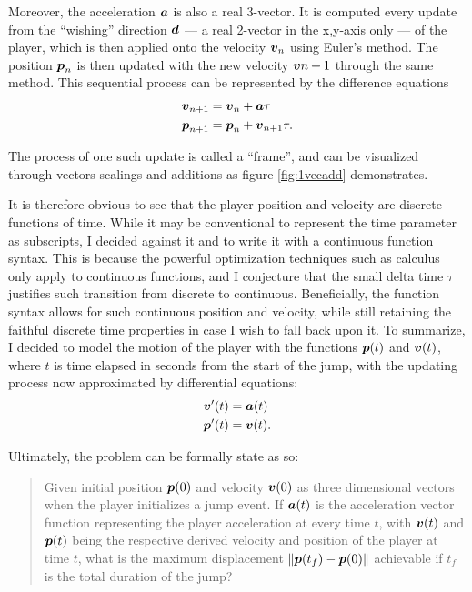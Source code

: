 Moreover, the acceleration $\boldsymbol{a}$ is also a real 3-vector. It is computed every update from the ``wishing'' direction $\boldsymbol{d}$ --- a real 2-vector in the x,y-axis only --- of the player, which is then applied onto the velocity $\boldsymbol{v}_n$ using Euler's method. The position $\boldsymbol{p}_n$ is then updated with the new velocity $\boldsymbol{v}{n+1}$ through the same method. This sequential process can be represented by the difference equations
\begin{align}
    \boldsymbol{v}_{n+1} &= \boldsymbol{v}_n + \boldsymbol{a} \tau\\
    \boldsymbol{p}_{n+1} &= \boldsymbol{p}_n + \boldsymbol{v}_{n+1} \tau.
\end{align}

The process of one such update is called a ``frame'', and can be visualized through vectors scalings and additions as figure \ref{fig:1vecadd} demonstrates.

It is therefore obvious to see that the player position and velocity are discrete functions of time. While it may be conventional to represent the time parameter as subscripts, I decided against it and to write it with a continuous function syntax. This is because the powerful optimization techniques such as calculus only apply to continuous functions, and I conjecture that the small delta time $\tau$ justifies such transition from discrete to continuous. Beneficially, the function syntax allows for such continuous position and velocity, while still retaining the faithful discrete time properties in case I wish to fall back upon it. To summarize, I decided to model the motion of the player with the functions $\boldsymbol{p}(t)$ and $\boldsymbol{v}(t)$, where $t$ is time elapsed in seconds from the start of the jump, with the updating process now approximated by differential equations:
\begin{align}
    \boldsymbol{v}'(t) &= \boldsymbol{a}(t) \label{eq:1de1}\\
    \boldsymbol{p}'(t) &= \boldsymbol{v}(t) \label{eq:1de2}.
\end{align}

Ultimately, the problem can be formally state as so:
\begin{quote}
    Given initial position $\boldsymbol{p}(0)$ and velocity $\boldsymbol{v}(0)$ as three dimensional vectors when the player initializes a jump event. If $\boldsymbol{a}(t)$ is the acceleration vector function representing the player acceleration at every time $t$, with $\boldsymbol{v}(t)$ and $\boldsymbol{p}(t)$ being the respective derived velocity and position of the player at time $t$, what is the maximum displacement $\|\boldsymbol{p}(t_f) - \boldsymbol{p}(0)\|$ achievable if $t_f$ is the total duration of the jump?
\end{quote}

